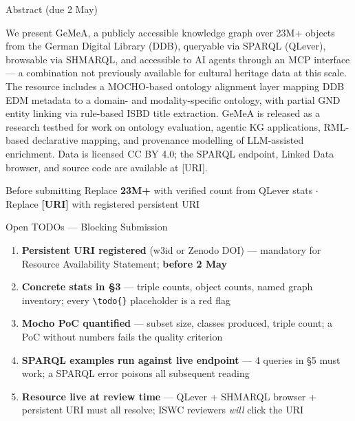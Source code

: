 \documentclass[xcolor,aspectratio=169,compress]{beamer}
\begin{document}
\begin{frame}{Abstract (due 2 May)}
  \small
  \begin{block}{}
    We present GeMeA, a publicly accessible knowledge graph over 23M+ objects from the German
    Digital Library (DDB), queryable via SPARQL (QLever), browsable via SHMARQL, and accessible
    to AI agents through an MCP interface --- a combination not previously available for cultural
    heritage data at this scale. The resource includes a MOCHO-based ontology alignment layer
    mapping DDB EDM metadata to a domain- and modality-specific ontology, with partial GND entity
    linking via rule-based ISBD title extraction. GeMeA is released as a research testbed for work
    on ontology evaluation, agentic KG applications, RML-based declarative mapping, and provenance
    modelling of LLM-assisted enrichment. Data is licensed CC BY 4.0; the SPARQL endpoint, Linked
    Data browser, and source code are available at [URI].
  \end{block}
  \smallskip
  \begin{alertblock}{Before submitting}
    Replace \textbf{23M+} with verified count from QLever stats \quad$\cdot$\quad
    Replace \textbf{[URI]} with registered persistent URI
  \end{alertblock}
\end{frame}

\begin{frame}{Open TODOs --- Blocking Submission}
  \small
  \begin{enumerate}\setlength{\itemsep}{4pt}
    \item[$\square$] \textbf{Persistent URI registered} (w3id or Zenodo DOI) ---
          mandatory for Resource Availability Statement; \textbf{before 2 May}

    \item[$\square$] \textbf{Concrete stats in §3} --- triple counts, object counts,
          named graph inventory; every \texttt{\textbackslash todo\{\}} placeholder is a red flag

    \item[$\square$] \textbf{Mocho PoC quantified} --- subset size, classes produced,
          triple count; a PoC without numbers fails the quality criterion

    \item[$\square$] \textbf{SPARQL examples run against live endpoint} --- 4 queries
          in §5 must work; a SPARQL error poisons all subsequent reading

    \item[$\square$] \textbf{Resource live at review time} --- QLever + SHMARQL browser
          + persistent URI must all resolve; ISWC reviewers \emph{will} click the URI
  \end{enumerate}
\end{frame}
\end{document}
